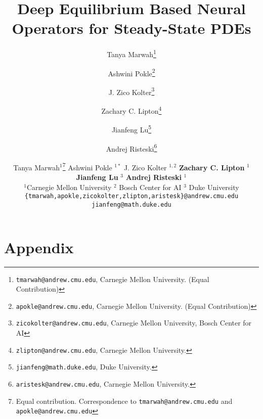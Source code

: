 \documentclass{article}
\title{Deep Equilibrium Based Neural Operators for Steady-State PDEs}
\author{
Tanya Marwah\footnote{\texttt{tmarwah@andrew.cmu.edu}, Carnegie Mellon University. (Equal Contribution)} 
\and
Ashwini Pokle\footnote{\texttt{apokle@andrew.cmu.edu}, Carnegie Mellon University. (Equal Contribution)} 
\and
J. Zico Kolter\footnote{\texttt{zicokolter@andrew.cmu.edu}, Carnegie Mellon University, Bosch Center for AI} 
\and 
Zachary C. Lipton\footnote{\texttt{zlipton@andrew.cmu.edu}, Carnegie Mellon University.}
\and Jianfeng Lu\footnote{\texttt{jianfeng@math.duke.edu}, Duke University.} 
\and Andrej Risteski\footnote{\texttt{aristesk@andrew.cmu.edu}, Carnegie Mellon University. 
}}
\author{
  Tanya Marwah$^1$\thanks{Equal contribution. Correspondence to \texttt{tmarwah@andrew.cmu.edu} and \texttt{apokle@andrew.cmu.edu}} \quad 
  Ashwini Pokle $^{1*}$ \quad
  J. Zico Kolter $^{1, 2}$ \quad 
  \textbf{Zachary C. Lipton} $^1$ \quad \\
  \textbf{Jianfeng Lu} $^3$ \quad 
  \textbf{Andrej Risteski} $^1$ \\
  $^1$Carnegie Mellon University \quad  $^2$ Bosch Center for AI \quad $^3$ Duke University \\
  \texttt{\{tmarwah,apokle,zicokolter,zlipton,aristesk\}@andrew.cmu.edu} \quad \\ \texttt{jianfeng@math.duke.edu}
  }
\begin{document}
\maketitle

\begin{abstract}

\end{abstract}


















\clearpage
\appendix
\section*{Appendix}

\end{document}
